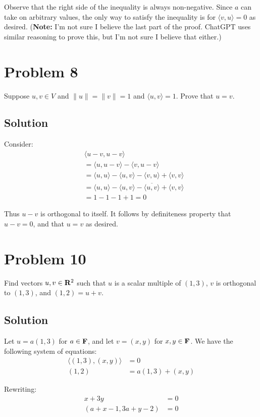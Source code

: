 \documentclass{article}
\begin{document}
Observe that the right side of the inequality is always non-negative. Since $a$ can take on arbitrary values, the only way to satisfy the inequality is for $\langle v,u\rangle=0$ as desired. (\textbf{Note:} I'm not sure I believe the last part of the proof. ChatGPT uses similar reasoning to prove this, but I'm not sure I believe that either.)

\section*{Problem 8}
Suppose $u,v\in V$ and $\|u\|=\|v\|=1$ and $\langle u,v\rangle=1$. Prove that $u=v$.

\subsection*{Solution}
Consider:
\begin{align*}
    &\langle u-v,u-v\rangle\\
    &=\langle u, u-v\rangle-\langle v, u-v\rangle\\
    &=\langle u,u\rangle-\langle u,v\rangle-\langle v,u\rangle+\langle v,v\rangle\\
    &=\langle u,u\rangle-\langle u,v\rangle-\overline{\langle u,v\rangle}+\langle v,v\rangle\\
    &=1-1-1+1=0
\end{align*}

Thus $u-v$ is orthogonal to itself. It follows by definiteness property that $u-v=0$, and that $u=v$ as desired.

\section*{Problem 10}
Find vectors $u,v\in\mathbf{R}^2$ such that $u$ is a scalar multiple of $(1,3)$, $v$ is orthogonal to $(1,3)$, and $(1,2)=u+v$.

\subsection*{Solution}
Let $u=a(1,3)$ for $a\in\mathbf{F}$, and let $v=(x,y)$ for $x,y\in\mathbf{F}$. We have the following system of equations:
\begin{align*}
    \langle (1,3), (x,y) \rangle&=0\\
    (1,2)&=a(1,3)+(x,y)
\end{align*}

Rewriting:
\begin{align*}
    x+3y&=0\\
    (a+x-1,3a+y-2)&=0
\end{align*}
\end{document}
